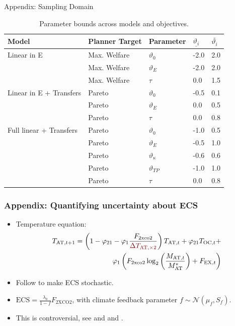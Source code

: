 \documentclass[aspectratio=169,11pt]{beamer}
\newcommand{\stoch}[1]{\textcolor{darkred}{#1}}
\begin{document}
\begin{frame}[fragile]{Appendix: Sampling Domain}
\begin{table}[ht!]
\centering
\small
\begin{tabular}{lllll}
\toprule
Model & Planner Target & Parameter & $\underline{\vartheta_i}$ & $\bar{\vartheta_i}$ \\
\midrule
Linear in E & Max. Welfare & $\vartheta_0$     & -2.0   & 2.0   \\
            & Max. Welfare & $\vartheta_E$     & -2.0   & 2.0  \\
           & Max. Welfare & $\tau$         & 0.0  & 1.5  \\
            \midrule
Linear in E + Transfers & Pareto & $\vartheta_0$ & -0.5 & 0.1 \\
                        & Pareto & $\vartheta_E$ & 0.0    & 0.5 \\
                        & Pareto & $\tau$         & 0.0  & 0.8  \\
\midrule
Full linear + Transfers & Pareto & $\vartheta_0$     & -1.0   & 0.5 \\
                        & Pareto & $\vartheta_E$     & -0.5 & 1.0   \\
                        & Pareto & $\vartheta_\kappa$ & -0.6 & 0.6 \\
                        & Pareto & $\vartheta_{TP}$   & -1.0   & 1.0   \\
                        & Pareto & $\tau$         & 0.0  & 0.8  \\
\bottomrule
\end{tabular}
\caption{Parameter bounds across models and objectives.}
\label{tab:param_bounds_main}
\end{table}
\end{frame}

\begin{frame}
\frametitle{Appendix: Quantifying uncertainty about ECS}
\small
\begin{itemize}
\item Temperature equation:
\begin{align}
T_{\mathrm{AT},t+1} = \left(1-\varphi_{21} - \varphi_1\frac{F_{\mathrm{2xco2}}}{\stoch{\Delta T_{\mathrm{AT},\times 2}}}\right)T_{\mathrm{AT},t}+\varphi_{21}T_{\mathrm{OC},t}+\\
\varphi_1 \left(F_{\mathrm{2xco2}} \log_2 \left(\frac{M_{\mathrm{AT},t}}{M_{\mathrm{AT}}^\ast} \right)+F_{\mathrm{EX},t} \right)
\end{align}
    \item Follow \cite{roe2007climate} to make ECS stochastic.
    \item $\mathrm{ECS}=\frac{\lambda_0}{1-f} F_{\mathrm{2XCO2}}$, with climate feedback parameter $ f \sim  \mathcal{N}\left(\mu_{f}, S_f \right) $.
\item  This is controversial, see \cite{zaliapin2010another} and \cite{roe2011comment} and \cite{zaliapin2011reply}.
\end{itemize}
\end{frame}
\end{document}
